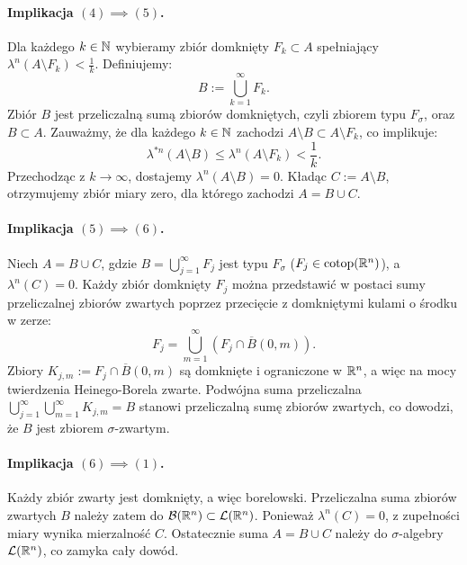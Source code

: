 \begin{dow}
    \paragraph{Implikacja $(4) \implies (5)$.}
    Dla każdego $k \in \mathbb{N}$ wybieramy zbiór domknięty $F_k \subset A$ spełniający $\lambda^n(A \setminus F_k) < \frac{1}{k}$.
    Definiujemy:
    \begin{equation*}
        B := \bigcup_{k=1}^\infty F_k.
    \end{equation*}
    Zbiór $B$ jest przeliczalną sumą zbiorów domkniętych, czyli zbiorem typu $F_\sigma$, oraz $B \subset A$. Zauważmy, że dla każdego $k \in \mathbb{N}$ zachodzi $A \setminus B \subset A \setminus F_k$, co implikuje:
    \begin{equation*}
        \lambda^{*n}(A \setminus B) \le \lambda^n(A \setminus F_k) < \frac{1}{k}.
    \end{equation*}
    Przechodząc z $k \to \infty$, dostajemy $\lambda^n(A \setminus B) = 0$. Kładąc $C := A \setminus B$, otrzymujemy zbiór miary zero, dla którego zachodzi $A = B \cup C$.

    \paragraph{Implikacja $(5) \implies (6)$.}
    Niech $A = B \cup C$, gdzie $B = \bigcup_{j=1}^\infty F_j$ jest typu $F_\sigma$ ($F_j \in \mathrm{cotop}(\mathbb{R}^{n})$), a $\lambda^n(C) = 0$.
    Każdy zbiór domknięty $F_j$ można przedstawić w postaci sumy przeliczalnej zbiorów zwartych poprzez przecięcie z domkniętymi kulami o środku w zerze:
    \begin{equation*}
        F_j = \bigcup_{m=1}^\infty \left( F_j \cap \overline{B}(0, m) \right).
    \end{equation*}
    Zbiory $K_{j, m} := F_j \cap \overline{B}(0, m)$ są domknięte i ograniczone w $\mathbb{R}^{n}$, a więc na mocy twierdzenia Heinego-Borela zwarte. Podwójna suma przeliczalna $\bigcup_{j=1}^\infty \bigcup_{m=1}^\infty K_{j, m} = B$ stanowi przeliczalną sumę zbiorów zwartych, co dowodzi, że $B$ jest zbiorem $\sigma$-zwartym.

    \paragraph{Implikacja $(6) \implies (1)$.}
    Każdy zbiór zwarty jest domknięty, a więc borelowski. Przeliczalna suma zbiorów zwartych $B$ należy zatem do $\mathcal{B}({\mathbb{R}^{n}}) \subset \mathcal{L}({\mathbb{R}^{n}})$. Ponieważ $\lambda^n(C) = 0$, z zupełności miary wynika mierzalność $C$. Ostatecznie suma $A = B \cup C$ należy do $\sigma$-algebry $\mathcal{L}({\mathbb{R}^{n}})$, co zamyka cały dowód.
\end{dow}

